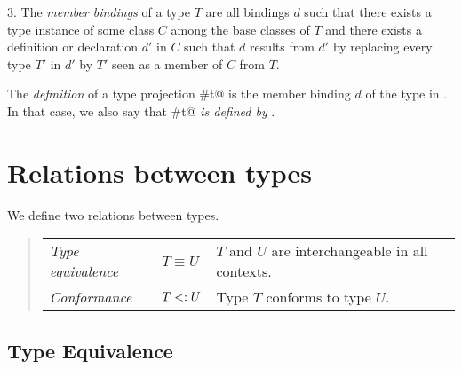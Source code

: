 \documentclass[11pt]{report}
\begin{document}
3. The {\em member bindings} of a type $T$ are all bindings $d$ such that
there exists a type instance of some class $C$ among the base classes of $T$
and there exists a definition or declaration $d'$ in $C$
such that $d$ results from $d'$ by replacing every
type $T'$ in $d'$ by $T'$ seen as a member of $C$ from $T$.

The {\em definition} of a type projection \verb@S#t@ is the member
binding $d$ of the type \verb@t@ in \verb@S@. In that case, we also say
that \verb@S#t@ {\em is defined by} \verb@d@.

\section{Relations between types}

We define two relations between types.
\begin{quote}\begin{tabular}{l@{\tab}l@{\tab}l}
\em Type equivalence & $T \equiv U$ & $T$ and $U$ are interchangeable
in all contexts.
\\
\em Conformance & $T <: U$ & Type $T$ conforms to type $U$.
\end{tabular}\end{quote}

\subsection{Type Equivalence}
\label{sec:type-equiv}
\end{document}
